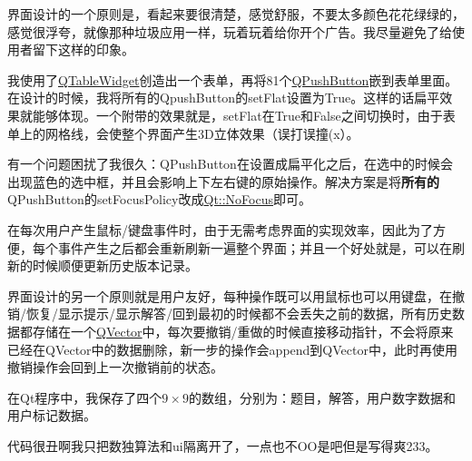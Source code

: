\documentclass[a4paper]{article}
\begin{document}
界面设计的一个原则是，看起来要很清楚，感觉舒服，不要太多颜色花花绿绿的，感觉很浮夸，就像那种垃圾应用一样，玩着玩着给你开个广告。我尽量避免了给使用者留下这样的印象。

我使用了\uline{QTableWidget}创造出一个表单，再将81个\uline{QPushButton}嵌到表单里面。在设计的时候，我将所有的QpushButton的setFlat设置为True。这样的话扁平效果就能够体现。一个附带的效果就是，setFlat在True和False之间切换时，由于表单上的网格线，会使整个界面产生3D立体效果（误打误撞(x）。

有一个问题困扰了我很久：QPushButton在设置成扁平化之后，在选中的时候会出现蓝色的选中框，并且会影响上下左右键的原始操作。解决方案是将{\bf 所有的}QPushButton的setFocusPolicy改成\uline{Qt::NoFocus}即可。

在每次用户产生鼠标/键盘事件时，由于无需考虑界面的实现效率，因此为了方便，每个事件产生之后都会重新刷新一遍整个界面；并且一个好处就是，可以在刷新的时候顺便更新历史版本记录。

界面设计的另一个原则就是用户友好，每种操作既可以用鼠标也可以用键盘，在撤销/恢复/显示提示/显示解答/回到最初的时候都不会丢失之前的数据，所有历史数据都存储在一个\uline{QVector}中，每次要撤销/重做的时候直接移动指针，不会将原来已经在QVector中的数据删除，新一步的操作会append到QVector中，此时再使用撤销操作会回到上一次撤销前的状态。

在Qt程序中，我保存了四个$9\times 9$的数组，分别为：题目，解答，用户数字数据和用户标记数据。

代码很丑啊我只把数独算法和ui隔离开了，一点也不OO是吧但是写得爽233。
\end{document}
